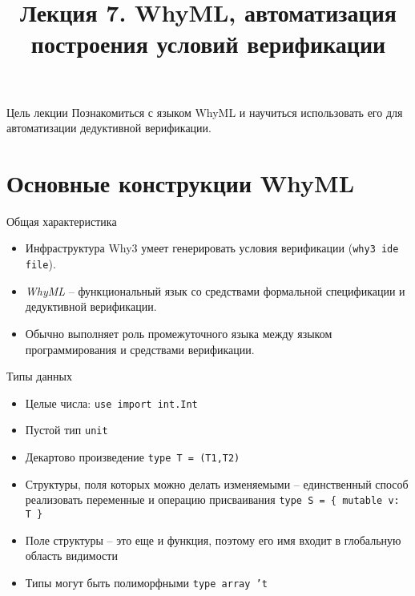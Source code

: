 \documentclass[hyperref={unicode=true}]{beamer}
\title{Лекция 7. WhyML, автоматизация построения условий верификации}
\author{}
\date{}
\begin{document}
	\begin{frame}{}
		\titlepage
	\end{frame}

    \begin{frame}{Цель лекции}
    Познакомиться с языком WhyML и
    научиться использовать его для
    автоматизации дедуктивной верификации.
    \end{frame}

    \section{Основные конструкции WhyML}

    \begin{frame}{Общая характеристика}
    \begin{itemize}
    \item
    Инфраструктура Why3 умеет генерировать
    условия верификации (\texttt{why3 ide file}).
    \item
    \textsl{WhyML} -- функциональный язык
    со средствами формальной спецификации и
    дедуктивной верификации.
    \item
    Обычно выполняет роль промежуточного языка
    между языком программирования и средствами
    верификации.
    \end{itemize}
    \end{frame}

    \begin{frame}{Типы данных}
    \begin{itemize}
    \item
    Целые числа: \texttt{use import int.Int}
    \item
    Пустой тип \texttt{unit}
    \item
    Декартово произведение \texttt{type T = (T1,T2)}
    \item
    Структуры, поля которых можно делать изменяемыми --
    единственный способ реализовать переменные и операцию
    присваивания \texttt{type S = \{ mutable v: T \}}
    \item
    Поле структуры -- это еще и функция, поэтому его имя
    входит в глобальную область видимости
    \item
    Типы могут быть полиморфными \texttt{type array 't}
    \end{itemize}
    \end{frame}
\end{document}
